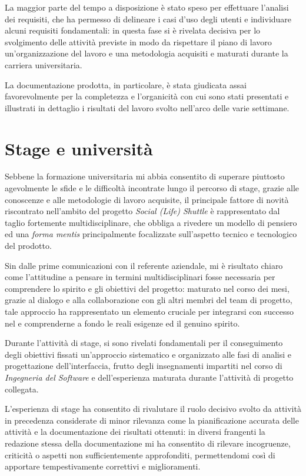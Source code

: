 La maggior parte del tempo a disposizione è stato speso per effettuare l'analisi dei requisiti, che ha permesso di delineare i casi d'uso degli utenti e individuare alcuni requisiti fondamentali: in questa fase si è rivelata decisiva per lo svolgimento delle attività previste in modo da rispettare il piano di lavoro un'organizzazione del lavoro e una metodologia acquisiti e maturati durante la carriera universitaria.

La documentazione prodotta, in particolare, è stata giudicata assai favorevolmente per la completezza e l'organicità con cui sono stati presentati e illustrati in dettaglio i risultati del lavoro svolto nell'arco delle varie settimane.

\section{Stage e università}
Sebbene la formazione universitaria mi abbia consentito di superare piuttosto agevolmente le sfide e le difficoltà incontrate lungo il percorso di stage, grazie alle conoscenze e alle metodologie di lavoro acquisite, il principale fattore di novità riscontrato nell'ambito del progetto \textit{Social (Life) Shuttle} è rappresentato dal taglio fortemente multidisciplinare, che obbliga a rivedere un modello di pensiero ed una \textit{forma mentis} principalmente focalizzate sull'aspetto tecnico e tecnologico del prodotto.

Sin dalle prime comunicazioni con il referente aziendale, mi è risultato chiaro come l'attitudine a pensare in termini multidisciplinari fosse necessaria per comprendere lo spirito e gli obiettivi del progetto: maturato nel corso dei mesi, grazie al dialogo e alla collaborazione con gli altri membri del team di progetto, tale approccio ha rappresentato un elemento cruciale per integrarsi con successo nel e comprenderne a fondo le reali esigenze ed il genuino spirito.

Durante l'attività di stage, si sono rivelati fondamentali per il conseguimento degli obiettivi fissati un'approccio sistematico e organizzato alle fasi di analisi e progettazione dell'interfaccia, frutto degli insegnamenti impartiti nel corso di \textit{Ingegneria del Software} e dell'esperienza maturata durante l'attività di progetto collegata.

L'esperienza di stage ha consentito di rivalutare il ruolo decisivo svolto da attività in precedenza considerate di minor rilevanza come la pianificazione accurata delle attività e la documentazione dei risultati ottenuti: in diversi frangenti la redazione stessa della documentazione mi ha consentito di rilevare incogruenze, criticità o aspetti non sufficientemente approfonditi, permettendomi così di apportare tempestivamente correttivi e miglioramenti.

